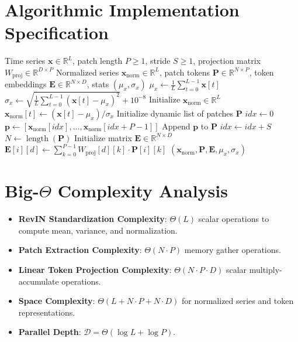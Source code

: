 \documentclass[11pt,a4paper]{article}
\theoremstyle{definition}
\begin{document}
\section{Algorithmic Implementation Specification}

\begin{algorithm}[H]
\caption{PatchTST Reversible Normalization and Patch Token Projection}
\begin{algorithmic}[1]
\Require Time series $\mathbf{x} \in \mathbb{R}^L$, patch length $P \ge 1$, stride $S \ge 1$, projection matrix $W_{\text{proj}} \in \mathbb{R}^{D \times P}$
\Ensure Normalized series $\mathbf{x}_{\text{norm}} \in \mathbb{R}^L$, patch tokens $\mathbf{P} \in \mathbb{R}^{N \times P}$, token embeddings $\mathbf{E} \in \mathbb{R}^{N \times D}$, stats $(\mu_x, \sigma_x)$
\State $\mu_x \gets \frac{1}{L}\sum_{t=0}^{L-1} \mathbf{x}[t]$
\State $\sigma_x \gets \sqrt{\frac{1}{L}\sum_{t=0}^{L-1} (\mathbf{x}[t] - \mu_x)^2} + 10^{-8}$
\State Initialize $\mathbf{x}_{\text{norm}} \in \mathbb{R}^L$
 
    \State $\mathbf{x}_{\text{norm}}[t] \gets (\mathbf{x}[t] - \mu_x) / \sigma_x$
\EndFor
\State Initialize dynamic list of patches $\mathbf{P}$
\State $idx \gets 0$
 
    \State $\mathbf{p} \gets [\mathbf{x}_{\text{norm}}[idx], \dots, \mathbf{x}_{\text{norm}}[idx + P - 1]]$
    \State Append $\mathbf{p}$ to $\mathbf{P}$
    \State $idx \gets idx + S$
\EndWhile
\State $N \gets \operatorname{length}(\mathbf{P})$
\State Initialize matrix $\mathbf{E} \in \mathbb{R}^{N \times D}$
 
        \State $\mathbf{E}[i][d] \gets \sum_{k=0}^{P-1} W_{\text{proj}}[d][k] \cdot \mathbf{P}[i][k]$
    \EndFor
\EndFor
\State \Return $(\mathbf{x}_{\text{norm}}, \mathbf{P}, \mathbf{E}, \mu_x, \sigma_x)$
\end{algorithmic}
\end{algorithm}

\section{Big-$\Theta$ Complexity Analysis}

\begin{itemize}
    \item \textbf{RevIN Standardization Complexity}: $\Theta(L)$ scalar operations to compute mean, variance, and normalization.
    \item \textbf{Patch Extraction Complexity}: $\Theta(N \cdot P)$ memory gather operations.
    \item \textbf{Linear Token Projection Complexity}: $\Theta(N \cdot P \cdot D)$ scalar multiply-accumulate operations.
    \item \textbf{Space Complexity}: $\Theta(L + N \cdot P + N \cdot D)$ for normalized series and token representations.
    \item \textbf{Parallel Depth}: $\mathcal{D} = \Theta(\log L + \log P)$.
\end{itemize}
\end{document}
